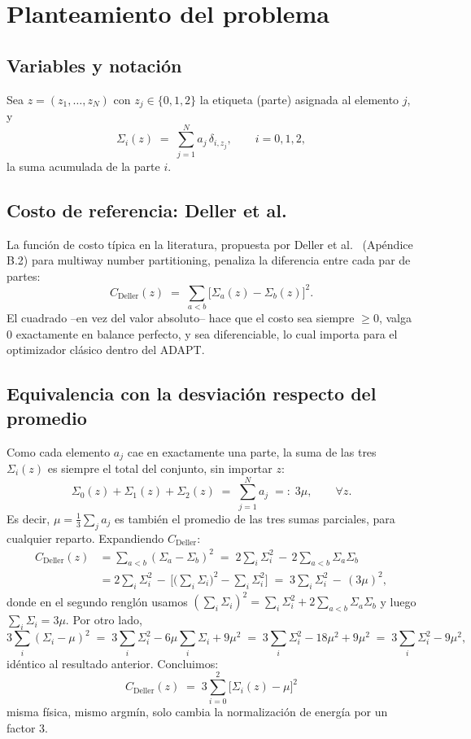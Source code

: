 \documentclass[11pt]{article}
\begin{document}
\section{Planteamiento del problema}

\subsection{Variables y notaci\'on}

Sea $z=(z_1,\dots,z_N)$ con $z_j\in\{0,1,2\}$ la etiqueta (parte) asignada
al elemento $j$, y
\[
  \Sigma_i(z) \;=\; \sum_{j=1}^{N} a_j\,\delta_{i,z_j}, \qquad i=0,1,2,
\]
la suma acumulada de la parte $i$.

\subsection{Costo de referencia: Deller et al.}

La funci\'on de costo t\'ipica en la literatura, propuesta por Deller et
al.\ \cite{deller2023} (Ap\'endice B.2) para multiway number partitioning,
penaliza la diferencia entre cada par de partes:
\[
  C_{\text{Deller}}(z) \;=\; \sum_{a<b} \big[\Sigma_a(z)-\Sigma_b(z)\big]^2 .
\]
El cuadrado --en vez del valor absoluto-- hace que el costo sea siempre
$\geq0$, valga $0$ exactamente en balance perfecto, y sea diferenciable,
lo cual importa para el optimizador cl\'asico dentro del ADAPT.

\subsection{Equivalencia con la desviaci\'on respecto del promedio}

Como cada elemento $a_j$ cae en exactamente una parte, la suma de las tres
$\Sigma_i(z)$ es siempre el total del conjunto, sin importar $z$:
\[
  \Sigma_0(z)+\Sigma_1(z)+\Sigma_2(z) \;=\; \sum_{j=1}^N a_j \;=:\; 3\mu,
  \qquad \forall z.
\]
Es decir, $\mu=\tfrac13\sum_j a_j$ es tambi\'en el promedio de las tres
sumas parciales, para cualquier reparto. Expandiendo $C_{\text{Deller}}$:
\begin{align*}
  C_{\text{Deller}}(z)
  &= \sum_{a<b}(\Sigma_a-\Sigma_b)^2
  \;=\; 2\sum_{i}\Sigma_i^2 \,-\, 2\sum_{a<b}\Sigma_a\Sigma_b \\
  &= 2\sum_i\Sigma_i^2 \,-\, \Big[\big(\textstyle\sum_i\Sigma_i\big)^2 - \sum_i\Sigma_i^2\Big]
  \;=\; 3\sum_i\Sigma_i^2 \,-\, (3\mu)^2,
\end{align*}
donde en el segundo rengl\'on usamos
$(\sum_i\Sigma_i)^2=\sum_i\Sigma_i^2+2\sum_{a<b}\Sigma_a\Sigma_b$ y luego
$\sum_i\Sigma_i=3\mu$. Por otro lado,
\[
  3\sum_i(\Sigma_i-\mu)^2 \;=\; 3\sum_i\Sigma_i^2 - 6\mu\sum_i\Sigma_i + 9\mu^2
  \;=\; 3\sum_i\Sigma_i^2 - 18\mu^2+9\mu^2 \;=\; 3\sum_i\Sigma_i^2-9\mu^2,
\]
id\'entico al resultado anterior. Concluimos:
\[
  \boxed{\; C_{\text{Deller}}(z) \;=\; 3\sum_{i=0}^{2}\big[\Sigma_i(z)-\mu\big]^2 \;}
\]
misma f\'isica, mismo argm\'in, solo cambia la normalizaci\'on de energ\'ia
por un factor $3$.
\end{document}
